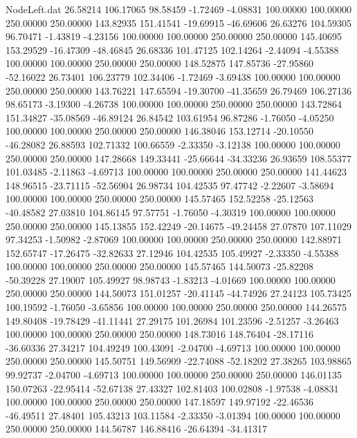\begin{filecontents}{NodeLeft.dat}
  26.58214  106.17065   98.58459    -1.72469   -4.08831  100.00000  100.00000  250.00000  250.00000  143.82935  151.41541  -19.69915  -46.69606
  26.63276  104.59305   96.70471    -1.43819   -4.23156  100.00000  100.00000  250.00000  250.00000  145.40695  153.29529  -16.47309  -48.46845
  26.68336  101.47125  102.14264    -2.44094   -4.55388  100.00000  100.00000  250.00000  250.00000  148.52875  147.85736  -27.95860  -52.16022
  26.73401  106.23779  102.34406    -1.72469   -3.69438  100.00000  100.00000  250.00000  250.00000  143.76221  147.65594  -19.30700  -41.35659
  26.79469  106.27136   98.65173    -3.19300   -4.26738  100.00000  100.00000  250.00000  250.00000  143.72864  151.34827  -35.08569  -46.89124
  26.84542  103.61954   96.87286    -1.76050   -4.05250  100.00000  100.00000  250.00000  250.00000  146.38046  153.12714  -20.10550  -46.28082
  26.88593  102.71332  100.66559    -2.33350   -3.12138  100.00000  100.00000  250.00000  250.00000  147.28668  149.33441  -25.66644  -34.33236
  26.93659  108.55377  101.03485    -2.11863   -4.69713  100.00000  100.00000  250.00000  250.00000  141.44623  148.96515  -23.71115  -52.56904
  26.98734  104.42535   97.47742    -2.22607   -3.58694  100.00000  100.00000  250.00000  250.00000  145.57465  152.52258  -25.12563  -40.48582
  27.03810  104.86145   97.57751    -1.76050   -4.30319  100.00000  100.00000  250.00000  250.00000  145.13855  152.42249  -20.14675  -49.24458
  27.07870  107.11029   97.34253    -1.50982   -2.87069  100.00000  100.00000  250.00000  250.00000  142.88971  152.65747  -17.26475  -32.82633
  27.12946  104.42535  105.49927    -2.33350   -4.55388  100.00000  100.00000  250.00000  250.00000  145.57465  144.50073  -25.82208  -50.39228
  27.19007  105.49927   98.98743    -1.83213   -4.01669  100.00000  100.00000  250.00000  250.00000  144.50073  151.01257  -20.41145  -44.74926
  27.24123  105.73425  100.19592    -1.76050   -3.65856  100.00000  100.00000  250.00000  250.00000  144.26575  149.80408  -19.78429  -41.11441
  27.29175  101.26984  101.23596    -2.51257   -3.26463  100.00000  100.00000  250.00000  250.00000  148.73016  148.76404  -28.17116  -36.60336
  27.34217  104.49249  100.43091    -2.04700   -4.69713  100.00000  100.00000  250.00000  250.00000  145.50751  149.56909  -22.74088  -52.18202
  27.38265  103.98865   99.92737    -2.04700   -4.69713  100.00000  100.00000  250.00000  250.00000  146.01135  150.07263  -22.95414  -52.67138
  27.43327  102.81403  100.02808    -1.97538   -4.08831  100.00000  100.00000  250.00000  250.00000  147.18597  149.97192  -22.46536  -46.49511
  27.48401  105.43213  103.11584    -2.33350   -3.01394  100.00000  100.00000  250.00000  250.00000  144.56787  146.88416  -26.64394  -34.41317

\end{filecontents}
